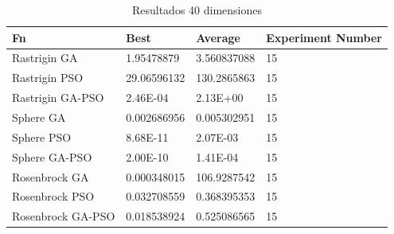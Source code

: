\documentclass[runningheads]{llncs}
\begin{document}
            \begin{table}[htp]
              \caption{Resultados 40 dimensiones}
              \label{table:resultados-2}
              \centering
              \begin{tabular}{|l|l|l|l|}
              \hline
              Fn & Best & Average & Experiment Number \\
              \hline
              \hline
              Rastrigin GA & 1.95478879 & 3.560837088 & 15\\
              \hline
              Rastrigin PSO & 29.06596132 & 130.2865863 & 15\\
              \hline
              Rastrigin GA-PSO & 2.46E-04 & 2.13E+00 & 15\\
              \hline
              Sphere GA & 0.002686956 & 0.005302951 & 15\\
              \hline
              Sphere PSO & 8.68E-11 & 2.07E-03 & 15\\
              \hline
              Sphere GA-PSO & 2.00E-10 & 1.41E-04 & 15\\
              \hline
              Rosenbrock GA & 0.000348015 & 106.9287542 & 15\\
              \hline
              Rosenbrock PSO & 0.032708559 & 0.368395353 & 15\\
              \hline
              Rosenbrock GA-PSO & 0.018538924 & 0.525086565 & 15\\
              \hline
              \end{tabular}
            \end{table}
\end{document}
